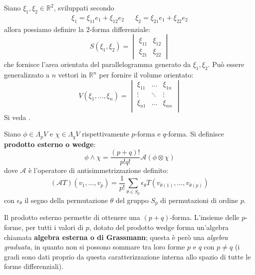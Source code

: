 \begin{esempio}
Siano $\xi_1,\xi_2 \in \mathbb{R}^2$, sviluppati secondo
\begin{align*}
    \xi_1 = \xi_{11}e_1 + \xi_{12} e_2 &&   \xi_2 = \xi_{21} e_1 + \xi_{22} e_2
\end{align*}
allora possiamo definire la 2-forma differenziale:
\begin{equation*}
    S(\xi_1,\xi_2)= 
    \begin{vmatrix}
    \xi_{11} & \xi_{12}\\
    \xi_{21} & \xi_{22}
    \end{vmatrix}
\end{equation*}
che fornisce l'area orientata del parallelogramma generato da $\xi_1, \xi_2$.
Può essere generalizzato a $n$ vettori in $\mathbb{R}^n$ per fornire il volume orientato:
\begin{equation*}
    V(\xi_1, \dots,\xi_n)= 
    \begin{vmatrix}
    \xi_{11} & \dots & \xi_{1n}\\
    \vdots & \ddots & \vdots\\
    \xi_{n1} & \dots & \xi_{nn} \\
    \end{vmatrix}
\end{equation*}
Si veda \cite{arnold}.
\end{esempio}

\begin{definizione}
Siano $\phi \in \Lambda_pV$ e $\chi \in \Lambda_q V$ rispettivamente $p$-forma e $q$-forma. Si definisce \textbf{prodotto esterno o wedge}:
\begin{equation*}
    \phi \wedge \chi = \frac{(p+q)!}{p!q!}\mathcal{A}(\phi \otimes \chi)
\end{equation*}
dove $\mathcal{A}$ è l'operatore di antisimmetrizzazione definito:
\begin{equation*}
    (\mathcal{A}T)(v_1,\dots,v_p) = \frac{1}{p!}\sum_{\theta \in S_p} \epsilon_\theta T( v_{\theta(1)}, \dots, v_{\theta(p)})
\end{equation*}
con $\epsilon_\theta$ il segno della permutazione $\theta$ del gruppo $S_p$ di permutazioni di ordine $p$.
\end{definizione}

Il prodotto esterno permette di ottenere una $(p+q)$-forma.
L'insieme delle $p$-forme, per tutti i valori di $p$, dotato del prodotto wedge forma un'algebra chiamata \textbf{algebra esterna o di Grassmann}; questa è però una \textit{algebra graduata}, in quanto non si possono sommare tra loro forme $p$ e $q$ con $p\neq q$ (i gradi sono dati proprio da questa caratterizzazione interna allo spazio di tutte le forme differenziali).

